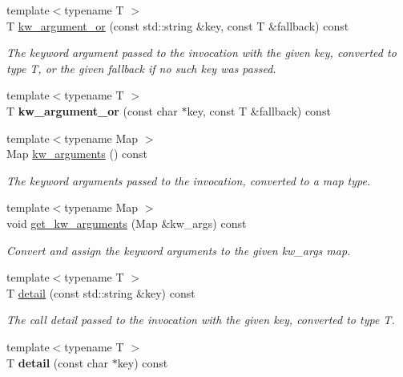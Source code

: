 \begin{DoxyCompactItemize}
\item 
{\footnotesize template$<$typename T $>$ }\\T \hyperlink{classautobahn_1_1wamp__invocation__impl_a5f6800828fbd715337cf0c0507d55ae7}{kw\+\_\+argument\+\_\+or} (const std\+::string \&key, const T \&fallback) const 
\begin{DoxyCompactList}\small\item\em The keyword argument passed to the invocation with the given {\ttfamily key}, converted to type T, or the given {\ttfamily fallback} if no such key was passed. \end{DoxyCompactList}\item 
{\footnotesize template$<$typename T $>$ }\\T {\bfseries kw\+\_\+argument\+\_\+or} (const char $\ast$key, const T \&fallback) const \hypertarget{classautobahn_1_1wamp__invocation__impl_a04dfe3f372adf8a7ab9a57cd6bacfc20}{}\label{classautobahn_1_1wamp__invocation__impl_a04dfe3f372adf8a7ab9a57cd6bacfc20}

\item 
{\footnotesize template$<$typename Map $>$ }\\Map \hyperlink{classautobahn_1_1wamp__invocation__impl_a29184a2573d07b389bc25bfa3444c112}{kw\+\_\+arguments} () const 
\begin{DoxyCompactList}\small\item\em The keyword arguments passed to the invocation, converted to a map type. \end{DoxyCompactList}\item 
{\footnotesize template$<$typename Map $>$ }\\void \hyperlink{classautobahn_1_1wamp__invocation__impl_aa0c032484a3a435c93ab3ffc38a5ff3f}{get\+\_\+kw\+\_\+arguments} (Map \&kw\+\_\+args) const 
\begin{DoxyCompactList}\small\item\em Convert and assign the keyword arguments to the given {\ttfamily kw\+\_\+args} map. \end{DoxyCompactList}\item 
{\footnotesize template$<$typename T $>$ }\\T \hyperlink{classautobahn_1_1wamp__invocation__impl_a25d03102258ec4e940a37bc6c154c347}{detail} (const std\+::string \&key) const 
\begin{DoxyCompactList}\small\item\em The call detail passed to the invocation with the given {\ttfamily key}, converted to type T. \end{DoxyCompactList}\item 
{\footnotesize template$<$typename T $>$ }\\T {\bfseries detail} (const char $\ast$key) const \hypertarget{classautobahn_1_1wamp__invocation__impl_acb9989525b70a89b97604d512abc82bd}{}\label{classautobahn_1_1wamp__invocation__impl_acb9989525b70a89b97604d512abc82bd}


\end{DoxyCompactItemize}
